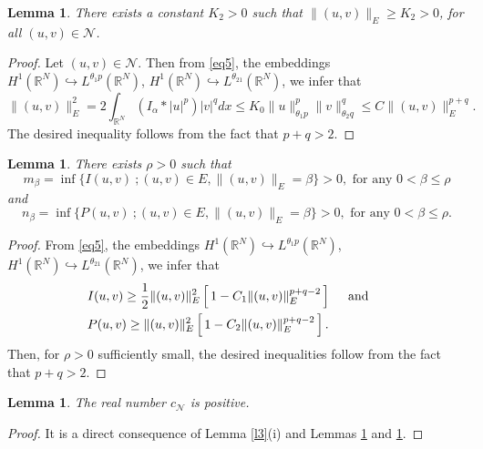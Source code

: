 \documentclass[12pt,a4paper]{article}
\newtheorem{lemma}[theorem]{Lemma}
\numberwithin{equation}{section}
\begin{document}
\begin{lemma}\label{l6}
There exists a constant $K_2>0$ such that $\|(u, v)\|_E \geq K_2 > 0$, for all $(u, v)\in \mathcal{N}$.
\end{lemma}
\begin{proof}
Let $(u, v)\in \mathcal{N}$. Then from \eqref{eq5}, the embeddings $H^1(\mathbb{R}^N) \hookrightarrow L^{\theta_1p}(\mathbb{R}^N)$, $H^1(\mathbb{R}^N) \hookrightarrow L^{\theta_21}(\mathbb{R}^N)$, we infer that
$$
\|(u, v)\|_{E}^{2} = 2 \int_{\mathbb{R}^N} (I_\alpha \ast |u|^p)|v|^q dx 
\leq K_0 \|u\|_{\theta_1 p}^{p}\|v\|_{\theta_2 q}^{q} \leq C \|(u, v)\|_{E}^{p+q}. 
$$
The desired inequality follows from the fact that $p+q>2$.
\end{proof}

\begin{lemma}\label{l7}
There exists $\rho>0$ such that
\begin{equation}\label{eq10}
m_\beta = \inf\{I(u, v) \ ; (u, v)\in E, \|(u, v)\|_E = \beta \} > 0, \mbox{ \ \ for any \ \ } 0 < \beta \leq \rho
\end{equation}
and 
\begin{equation}\label{eq11}
n_\beta = \inf\{P(u, v) \ ; (u, v)\in E, \|(u, v)\|_E = \beta \} > 0, \mbox{ \ \ for any \ \ } 0 < \beta \leq \rho.
\end{equation}
\end{lemma}
\begin{proof}
From \eqref{eq5}, the embeddings $H^1(\mathbb{R}^N) \hookrightarrow L^{\theta_1p}(\mathbb{R}^N)$, $H^1(\mathbb{R}^N) \hookrightarrow L^{\theta_21}(\mathbb{R}^N)$, we infer that
\begin{align*}
&I(u, v) \geq \dfrac{1}{2}\|(u, v)\|_{E}^{2}\left[\, 1-C_1\|(u, v)\|_{E}^{p+q-2}\,\right] \mbox{ \ \ \ and \ \ \ }\vspace{10pt}\\  &P(u, v) \geq \|(u, v)\|_{E}^{2}\left[\, 1-C_2\|(u, v)\|_{E}^{p+q-2}\, \right].
\end{align*}
Then, for $\rho > 0$ sufficiently small, the desired inequalities follow from the fact that $p+q>2$.
\end{proof}


\begin{lemma}\label{l8}
The real number $c_\mathcal{N}$ is positive.
\end{lemma}
\begin{proof}
It is a direct consequence of Lemma \ref{l3}(i) and Lemmas \ref{l6} and \ref{l7}. 
\end{proof}
\end{document}
